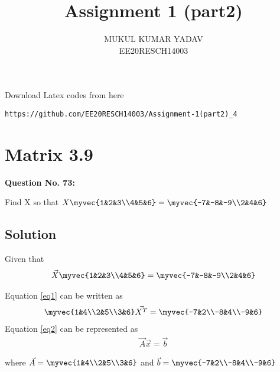 \documentclass[journal,12pt,twocolumn]{IEEEtran}
\begin{document}
     \def\rightbox#1{\makebox[0in][r]{#1}}
     \def\centbox#1{\makebox[0in]{#1}}
     \def\topbox#1{\raisebox{-\baselineskip}[0in][0in]{#1}}
     \def\midbox#1{\raisebox{-0.5\baselineskip}[0in][0in]{#1}}
\vspace{3cm}
\title{Assignment 1 (part2)}
\author{MUKUL KUMAR YADAV\\ EE20RESCH14003}
\maketitle
\newpage
\bigskip
\renewcommand{\thefigure}{\theenumi}
\renewcommand{\thetable}{\theenumi}
 Download Latex codes from here
\begin{lstlisting}
https://github.com/EE20RESCH14003/Assignment-1(part2)_4
\end{lstlisting}
%

%

%
\section{\textbf{ Matrix 3.9}}
\textbf{Question No. 73:} 

Find X so that $X\myvec{1&2&3\\4&5&6}=\myvec{-7&-8&-9\\2&4&6}$

\subsection{\textbf{Solution}}

Given that 
\begin{align}\label{eq1}
\Vec{X}\myvec{1&2&3\\4&5&6}=\myvec{-7&-8&-9\\2&4&6}
\end{align}

Equation \eqref{eq1} can be written as 
\begin{align}\label{eq2}
\myvec{1&4\\2&5\\3&6}\Vec{X^T}=\myvec{-7&2\\-8&4\\-9&6}
\end{align}
Equation \eqref{eq2} can be represented as 
\begin{align}\label{eq3}
\vec{A}\vec{x}=\vec{b}
\end{align}

where $\vec{A}=\myvec{1&4\\2&5\\3&6}$ and $\vec{b}=\myvec{-7&2\\-8&4\\-9&6}$
\end{document}
